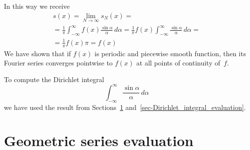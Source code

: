 \documentclass[12pt]{amsart}
\theoremstyle{definition}
\numberwithin{equation}{section}
\begin{document}
In this way we receive
\begin{eqnarray}
\label{eq:our_result}
s(x)
=
\lim_{N \rightarrow \infty} s_{N}(x) =                                                   \\ \nonumber
=
\frac{1}{\pi} \int_{-\infty}^{\infty} f(x) \frac{\sin \alpha}{\alpha} \, d\alpha
=
\frac{1}{\pi} f(x) \int_{-\infty}^{\infty} \frac{\sin \alpha}{\alpha} \, d\alpha    =    \\ \nonumber
= \frac{1}{\pi} f(x) \pi = f(x)
\end{eqnarray}
We have shown that 
if $f(x)$ is periodic and piecewise smooth function, then its Fourier 
series converges pointwise to $f(x)$ at all points of continuity of~$f$\@.


To compute the Dirichlet integral
\[
\int_{-\infty}^{\infty} \frac{\sin \alpha}{\alpha} \, d\alpha
\]
we have used the result from Sections~\ref{sec-Geometric_series_evaluation} and~\ref{sec-Dirichlet_integral_evaluation}\@.




\section{Geometric series evaluation}
\label{sec-Geometric_series_evaluation}
\end{document}
